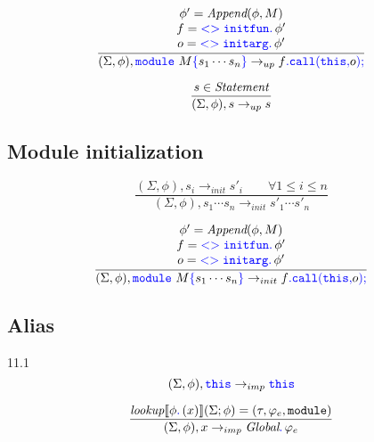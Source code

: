 \documentclass[a4paper]{article}
\newcommand{\code}[1]{\textcolor{blue}{\tt #1}}
\newcommand{\mydot}{.\,}
\newcommand{\module}{{\tt{module}}}
\newcommand{\lookup}{\emph{lookup}}
\begin{document}
\begin{equation*}
\frac{
    \begin{array}{c}
    \phi' = \emph{Append} (\phi, M) \\
    f = \code{<>initfun \mydot} \phi' \\
    o = \code{<>initarg \mydot} \phi' \\
    \end{array}
}{
    (\Sigma, \phi), \code{module}\ M \code{\{} s_1 \cdots s_n \code{\}} \rightarrow_{up} f \code{.call(this,} o \code{);}
}
\end{equation*}

\begin{equation*}
\frac{
    s \in \emph{Statement}
}{
    (\Sigma, \phi), s \rightarrow_{up} s
}
\end{equation*}

\subsection{Module initialization}
\begin{equation*}
\frac{
    (\Sigma, \phi), s_i \rightarrow_{init} s'_i \qquad \forall 1 \le i \le n
}{
    (\Sigma, \phi), s_1 \cdots s_n \rightarrow_{init} s'_1 \cdots s'_n
}
\end{equation*}

\begin{equation*}
\frac{
    \begin{array}{c}
    \phi' = \emph{Append} (\phi, M) \\
    f = \code{<>initfun \mydot} \phi' \\
    o = \code{<>initarg \mydot} \phi' \\
    \end{array}
}{
    (\Sigma, \phi), \code{module}\ M \code{\{} s_1 \cdots s_n \code{\}} \rightarrow_{init} f \code{.call(this,} o \code{);}
}
\end{equation*}

\subsection{Alias}
11.1
\begin{equation*}
(\Sigma, \phi), \code{this} \rightarrow_{imp} \code{this}
\end{equation*}

\begin{equation*}
\frac{
    \lookup \llbracket \phi \code{\mydot} (x) \rrbracket (\Sigma; \phi) = (\tau, \varphi_e, \module)
}{
    (\Sigma, \phi), x \rightarrow_{imp} \emph{Global} \code{\mydot} \varphi_e
}
\end{equation*}
\end{document}
